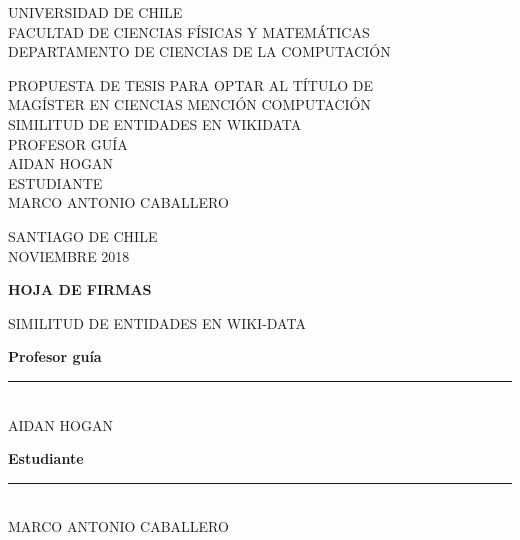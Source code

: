 \documentclass[a4paper,12pt]{article}
\begin{document}
\thispagestyle{empty}
\begin{center}

UNIVERSIDAD DE CHILE\\
FACULTAD DE CIENCIAS FÍSICAS Y MATEMÁTICAS\\
DEPARTAMENTO DE CIENCIAS DE LA COMPUTACIÓN\\

\vspace{5cm}

\MakeUppercase{Propuesta de tesis para optar al título de} \\
\MakeUppercase{Magíster en Ciencias mención Computación}\\
\vspace{2cm}
\MakeUppercase{Similitud de Entidades en WIKIDATA} \\


\vspace{2cm}
\MakeUppercase{Profesor guía} \\
\MakeUppercase{Aidan Hogan} \\
\vspace{2cm}
\MakeUppercase{Estudiante}\\
\MakeUppercase{Marco Antonio Caballero}

\vfill

SANTIAGO DE CHILE\\
NOVIEMBRE 2018 
\end{center}
\newpage

\begin{center}
\textbf{\MakeUppercase{Hoja de firmas}}

\vspace{5cm}
\MakeUppercase{Similitud de Entidades en WIKI-DATA} \\


\vspace{4cm}

\textbf{Profesor guía} \\
\vspace{2cm}
\rule{90mm}{0.1mm} \\
\MakeUppercase{Aidan Hogan} \\

\vspace{3cm}

\textbf{Estudiante} \\
\vspace{2cm}
\rule{90mm}{0.1mm} \\
\MakeUppercase{Marco Antonio Caballero}

\end{center}
\newpage




\end{document}
